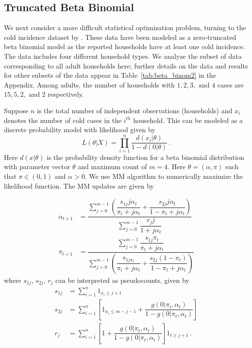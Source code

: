 \documentclass{statsoc}
\begin{document}
\subsection{Truncated Beta Binomial} \label{ex:trunc.beta.binom}


We next consider a more difficult statistical optimization problem, turning to the cold incidence dataset by \cite{lidwell1951observations}.  These data have been modeled as a zero-truncated beta binomial model as the reported households have at least one cold incidence. %
The data includes four different household types. We analyze the subset of data corresponding to all adult households here; further details on the data and results for other subsets of the data appear in Table~\ref{tab:beta_binom2} in the Appendix. Among adults, the number of households with $1, 2, 3, \text{ and }4$ cases are $15, 5, 2, \text{ and }2$ respectively.  %

Suppose $n$ is the total number of independent observations (households) and $x_i$ denotes the number of cold cases in the $i^{th}$ household. This can be modeled as a discrete probability model \citep{zhou2011quasi} with likelihood given by
\[
L(\theta | X) = \prod_{i=1}^{n}\dfrac{d(x_i| \theta)}{1-d(0|\theta)}\,.
\]
Here $d(x|\theta)$ is the probability density function for a beta binomial distribution with parameter vector $\theta$ and maximum count of $m=4$. Here $\theta = (\alpha, \pi)$ such that $\pi \in (0,1)$ and $\alpha >0$. We use MM algorithm to numerically maximize the likelihood function. The MM updates are given by 

\begin{align*}
    \alpha_{t+1} &= \dfrac{\sum_{j=0}^{m-1} (\dfrac{s_{1j}j \alpha_t}{\pi_t + j\alpha_t} + \dfrac{s_{2j}j \alpha_t}{1 - \pi_t + j\alpha_t})}{\sum_{j=0}^{m-1}\dfrac{r_j j }{1 + j \alpha_t}}\\
    \pi_{t+1} &= \dfrac{\sum_{j=0}^{m-1}\dfrac{s_{1j}\pi_t}{\pi_t + j\alpha_t}}{\sum_{j=0}^{m-1}(\dfrac{s_{1j \pi_t}}{\pi_t + j \alpha_t} + \dfrac{s_{2j}(1-\pi_t)}{1- \pi_t + j \alpha_t})}
\end{align*}
where $s_{1j}, \, s_{2j},\, r_j$ can be interpreted as pseudocounts, given by
\begin{align*}
    s_{1j} &= \sum_{i=1}^{n}1_{x_i \geq j+1}\\
    s_{2j} &= \sum_{i=1}^{n} \left[ 1_{x_i \leq m-j-1} + \dfrac{g(0|\pi_t, \alpha_t)}{1 - g(0 | \pi_t, \alpha_t)} \right]\\
    r_j &= \sum_{i=1}^{n}\left[ 1 +  \dfrac{g(0|\pi_t, \alpha_t)}{1 - g(0 | \pi_t, \alpha_t)} \right] 1_{t \geq j+1}\,.
\end{align*}
\end{document}
